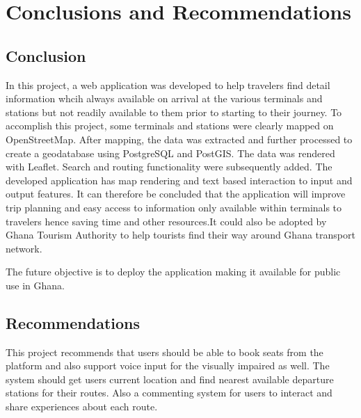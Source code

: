 
\chapter{Conclusions and Recommendations} %



\ifpdf
    \graphicspath{{5/figures/PNG/}{5/figures/PDF/}{5/figures/}}
\else
    \graphicspath{{5/figures/EPS/}{5/figures/}}
\fi

\section{Conclusion}
In this project, a web application was developed to help travelers find detail information whcih always available on arrival at the various terminals and stations but not readily available to them prior to starting to their journey. To accomplish this project, some terminals and stations were clearly mapped on OpenStreetMap. After mapping, the data was extracted and further processed to create a geodatabase using PostgreSQL and PostGIS. The data was rendered with Leaflet. Search and routing functionality were subsequently added. The developed application has map rendering and text based interaction to input and output features. It can therefore be concluded that the application will improve trip planning and easy access to information only available within terminals to travelers hence saving time and other resources.It could also be adopted by Ghana Tourism Authority to help tourists find their way around Ghana transport network.

The future objective is to deploy the application making it available for public use in Ghana.

\section{Recommendations}
This project recommends that users should be able to book seats from the platform and also support voice input for the visually impaired as well. The system should get users current location and find nearest available departure stations for their routes. Also a commenting system for users to interact and share experiences about each route.


